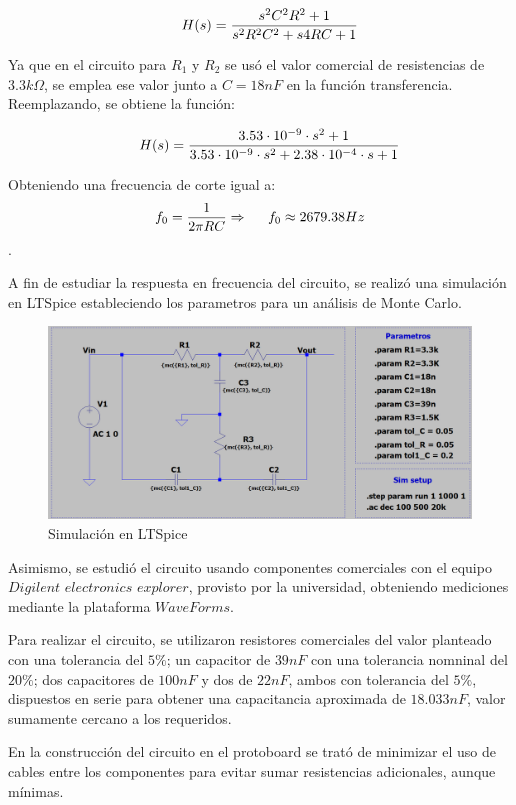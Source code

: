 $$\hspace{0.5cm} H(s) = \frac{s^2C^2R^2 + 1}{s^2R^2C^2 + s4RC + 1}$$

Ya que en el circuito para $R_1$ y $R_2$ se usó el valor comercial de resistencias de $3.3k\Omega$, se emplea ese valor junto a $C = 18nF$ en la función transferencia. Reemplazando, se obtiene la función:

$$\hspace{0.5cm} H(s) = \frac{3.53\cdot 10^{-9}\cdot s^{2} + 1}{3.53\cdot 10^{-9}\cdot s^{2} + 2.38\cdot 10^{-4}\cdot s + 1}$$

Obteniendo una frecuencia de corte igual a:
$$f_0 = \frac{1}{2\pi RC} \Rightarrow \hspace{0.5cm} f_0 \approx 2679.38 Hz$$.

A fin de estudiar la respuesta en frecuencia del circuito, se realizó una simulación en LTSpice estableciendo los parametros para un análisis de Monte Carlo.

\begin{figure}[h]
	\centering
	\includegraphics[scale=0.4]{../Informe/Imagenes/simu.png}
	\caption{Simulación en LTSpice}
	\label{ej1cir}
\end{figure}

Asimismo, se estudió el circuito usando componentes comerciales con el equipo $Digilent$ $electronics$ $explorer$, provisto por la universidad, obteniendo mediciones mediante la plataforma $WaveForms$.

Para realizar el circuito, se utilizaron resistores comerciales del valor planteado con una tolerancia del $5\%$; un capacitor de $39nF$ con una tolerancia nomninal del $20\%$; dos capacitores de $100nF$ y dos de $22nF$, ambos con tolerancia del $5\%$, dispuestos en serie para obtener una capacitancia aproximada de $18.033nF$, valor sumamente cercano a los requeridos.

En la construcción del circuito en el protoboard se trató de minimizar el uso de cables entre los componentes para evitar sumar resistencias adicionales, aunque mínimas. 

